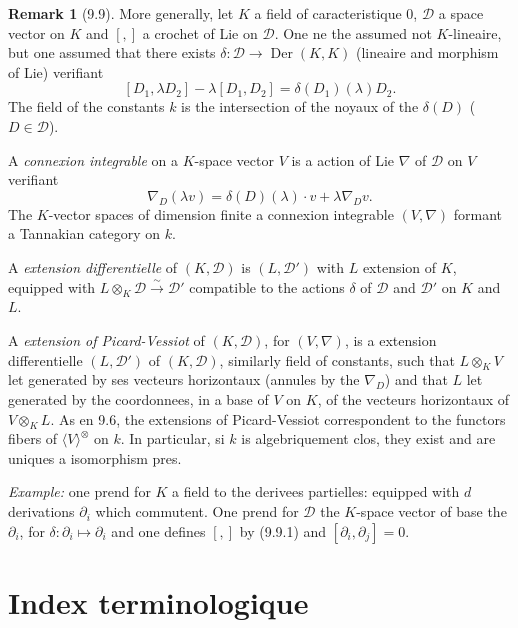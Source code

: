 \documentclass[12pt,a4paper]{article}
\theoremstyle{plain}
\theoremstyle{definition}
\newtheorem{remark}[theorem]{Remark}
\DeclareMathOperator{\Der}{Der}
\begin{document}
\begin{remark}[9.9]
More generally, let $K$ a field of caracteristique 0, $\mathcal{D}$ a space vector on $K$ and $[,]$ a crochet of Lie on $\mathcal{D}$. One ne the assumed not $K$-lineaire, but one assumed that there exists $\delta : \mathcal{D} \to \Der(K, K)$ (lineaire and morphism of Lie) verifiant
\begin{equation}\label{eq:9.9.1}
[D_1, \lambda D_2] - \lambda[D_1, D_2] = \delta(D_1)(\lambda) D_2.
\end{equation}
The field of the constants $k$ is the intersection of the noyaux of the $\delta(D)$ ($D \in \mathcal{D}$).

A \emph{connexion integrable} on a $K$-space vector $V$ is a action of Lie $\nabla$ of $\mathcal{D}$ on $V$ verifiant
\[
\nabla_D(\lambda v) = \delta(D)(\lambda) \cdot v + \lambda \nabla_D v.
\]
The $K$-vector spaces of dimension finite a connexion integrable $(V, \nabla)$ formant a Tannakian category on $k$.

A \emph{extension differentielle} of $(K, \mathcal{D})$ is $(L, \mathcal{D}')$ with $L$ extension of $K$, equipped with $L \otimes_K \mathcal{D} \xrightarrow{\sim} \mathcal{D}'$ compatible to the actions $\delta$ of $\mathcal{D}$ and $\mathcal{D}'$ on $K$ and $L$.

A \emph{extension of Picard-Vessiot} of $(K, \mathcal{D})$, for $(V, \nabla)$, is a extension differentielle $(L, \mathcal{D}')$ of $(K, \mathcal{D})$, similarly field of constants, such that $L \otimes_K V$ let generated by ses vecteurs horizontaux (annules by the $\nabla_D$) and that $L$ let generated by the coordonnees, in a base of $V$ on $K$, of the vecteurs horizontaux of $V \otimes_K L$. As en 9.6, the extensions of Picard-Vessiot correspondent to the functors fibers of $\langle V \rangle^\otimes$ on $k$. In particular, si $k$ is algebriquement clos, they exist and are uniques a isomorphism pres.

\textit{Example:} one prend for $K$ a field to the derivees partielles: equipped with $d$ derivations $\partial_i$ which commutent. One prend for $\mathcal{D}$ the $K$-space vector of base the $\partial_i$, for $\delta : \partial_i \mapsto \partial_i$ and one defines $[,]$ by (9.9.1) and $[\partial_i, \partial_j] = 0$.
\end{remark}

\section*{Index terminologique}
\end{document}
